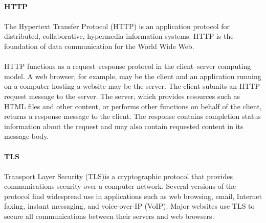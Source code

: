 \paragraph{} \textbf{HTTP}
\paragraph{}
The Hypertext Transfer Protocol (HTTP) is an application protocol for distributed, collaborative, hypermedia information systems. HTTP is the foundation of data communication for the World Wide Web.
\paragraph{}
HTTP functions as a request–response protocol in the client–server computing model. A web browser, for example, may be the client and an application running on a computer hosting a website may be the server. The client submits an HTTP request message to the server. The server, which provides resources such as HTML files and other content, or performs other functions on behalf of the client, returns a response message to the client. The response contains completion status information about the request and may also contain requested content in its message body.

\paragraph{} \textbf{TLS}
\paragraph{}
Transport Layer Security (TLS)is a cryptographic protocol that provides communications security over a computer network. Several versions of the protocol find widespread use in applications such as web browsing, email, Internet faxing, instant messaging, and voice-over-IP (VoIP). Major websites use TLS to secure all communications between their servers and web browsers.
